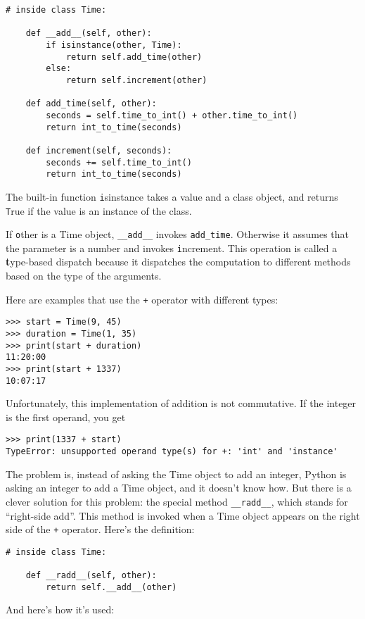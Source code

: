 \documentclass[
DIV=11,
fontsize=13,
twoside,
headinclude=false,
titlepage=firstiscover,
abstract=true,
headsepline=true,
footsepline=true,
chapterprefix=true, %
headings=big,
bibliography=totoc,%
captions=tableheading
]{scrbook}
\theoremstyle{definition}
\begin{document}
\begin{lstlisting}
# inside class Time:

    def __add__(self, other):
        if isinstance(other, Time):
            return self.add_time(other)
        else:
            return self.increment(other)

    def add_time(self, other):
        seconds = self.time_to_int() + other.time_to_int()
        return int_to_time(seconds)

    def increment(self, seconds):
        seconds += self.time_to_int()
        return int_to_time(seconds)
\end{lstlisting}
%
The built-in function {\texttt isinstance} takes a value and a
class object, and returns {\texttt True} if the value is an instance
of the class.

If {\texttt other} is a Time object, \verb"__add__" invokes
\verb"add_time".  Otherwise it assumes that the parameter
is a number and invokes {\texttt increment}.  This operation is
called a {\textbf type-based dispatch} because it dispatches the
computation to different methods based on the type of the
arguments.

Here are examples that use the {\texttt +} operator with different
types:

\begin{lstlisting}
>>> start = Time(9, 45)
>>> duration = Time(1, 35)
>>> print(start + duration)
11:20:00
>>> print(start + 1337)
10:07:17
\end{lstlisting}
%
Unfortunately, this implementation of addition is not commutative.
If the integer is the first operand, you get

\begin{lstlisting}
>>> print(1337 + start)
TypeError: unsupported operand type(s) for +: 'int' and 'instance'
\end{lstlisting}
%
The problem is, instead of asking the Time object to add an integer,
Python is asking an integer to add a Time object, and it doesn't know
how.  But there is a clever solution for this problem: the
special method \verb"__radd__", which stands for ``right-side add''.
This method is invoked when a Time object appears on the right side of
the {\texttt +} operator.  Here's the definition:

\begin{lstlisting}
# inside class Time:

    def __radd__(self, other):
        return self.__add__(other)
\end{lstlisting}
%
And here's how it's used:
\end{document}
